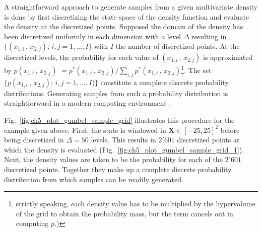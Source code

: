 A straightforward approach to generate samples from a given multivariate density is done by first 
discretizing the state space of the density function and evaluate the density at the discretized points.
Supposed the domain of the density has been discretized uniformly in each dimension with a level $\Delta$ resulting in $\{(x_{1,i}\,,\,x_{2,j});\, i, j = 1, \ldots, I\}$ with $I$ the number of discretized points.
At the discretized levels, the probability for each value of $(x_{1,i}\,,\,x_{2,j})$ is approximated by $p(x_{1,i}\,,\,x_{2,j})$ $= p^*(x_{1,i}\,,\,x_{2,j}) / \sum_{i,j} p^*(x_{1,i}\,,\,x_{2,j})$\footnote{strictly speaking, each density value has to be multiplied by the hypervolume of the grid to obtain the probability mass, but the term cancels out in computing $p$.)}.
The set $\{p(x_{1,i}\,,\,x_{2,j});\, i,j = 1,\ldots,I)\}$ constitute a complete discrete probability distributions.
Generating samples from such a probability distribution is straightforward in a modern computing environment \cite{Mackay2005}.

Fig.~\ref{fig:ch5_plot_gumbel_sample_grid} illustrates this procedure for the example given above.
First, the state is windowed in $\mathbf{X}\in[-25,25]^2$ before being discretized in $\Delta = 50$ levels.
This results in $2'601$ discretized points at which the density is evaluated (Fig.~\ref{fig:ch5_plot_gumbel_sample_grid_1}).
Next, the density values are taken to be the probability for each of the $2'601$ discretized points.
Together they make up a complete discrete probability distribution from which samples can be readily generated.

